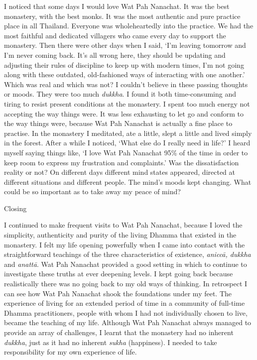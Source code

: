 I noticed that some days I would love Wat Pah Nanachat. It was the best
monastery, with the best monks. It was the most authentic and pure
practice place in all Thailand. Everyone was wholeheartedly into the
practice. We had the most faithful and dedicated villagers who came
every day to support the monastery. Then there were other days when I
said, `I'm leaving tomorrow and I'm never coming back. It's all wrong
here, they should be updating and adjusting their rules of discipline to
keep up with modern times, I'm not going along with these outdated, 
old-fashioned ways of interacting with one another.' Which was real and
which was not? I couldn't believe in these passing thoughts or moods. 
They were too much \emph{dukkha}. I found it both time-consuming and
tiring to resist present conditions at the monastery. I spent too much
energy not accepting the way things were. It was less exhausting to let
go and conform to the way things were, because Wat Pah Nanachat is
actually a fine place to practise. In the monastery I meditated, ate a
little, slept a little and lived simply in the forest. After a while I
noticed, `What else do I really need in life?' I heard myself saying
things like, `I love Wat Pah Nanachat 95\% of the time in order to keep
room to express my frustration and complaints.' Was the dissatisfaction
reality or not? On different days different mind states appeared, 
directed at different situations and different people. The mind's moods
kept changing. What could be so important as to take away my peace of
mind? 

Closing

I continued to make frequent visits to Wat Pah Nanachat, because I loved
the simplicity, authenticity and purity of the living Dhamma that
existed in the monastery. I felt my life opening powerfully when I came
into contact with the straightforward teachings of the three
characteristics of existence, \emph{aniccā, dukkha} and \emph{anattā}. 
Wat Pah Nanachat provided a good setting in which to continue to
investigate these truths at ever deepening levels. I kept going back
because realistically there was no going back to my old ways of
thinking. In retrospect I can see how Wat Pah Nanachat shook the
foundations under my feet. The experience of living for an extended
period of time in a community of full-time Dhamma practitioners, people
with whom I had not individually chosen to live, became the teaching of
my life. Although Wat Pah Nanachat always managed to provide an array of
challenges, I learnt that the monastery had no inherent \emph{dukkha}, 
just as it had no inherent \emph{sukha} (happiness). I needed to take
responsibility for my own experience of life. 

